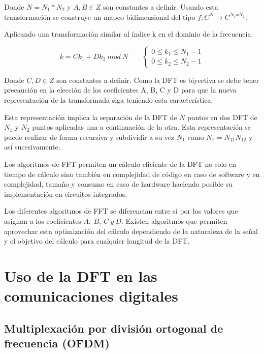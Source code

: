 Donde $N=N_1*N_2$ y $A,B \in Z$ son constantes a definir. Usando esta
transformación se construye un mapeo bidimensional del tipo $f:C^N\rightarrow
C^{N_1xN_2}$.

Aplicando una transformación similar al índice k en el dominio de la frecuencia:

\begin{equation}
k = Ck_1 + Dk_2 \ mod\ N \qquad 
	\begin{cases}
	0\leq k_1 \leq N_1 -1 \\
	0\leq k_2 \leq N_2 -1
	\end{cases}
\label{eq:freqInedx}
\end{equation}

Donde $C,D \in Z$ son constantes a definir. Como la DFT es biyectiva se debe
tener precaución en la elección de los coeficientes A, B, C y D para que la
nueva representación de la transformada siga teniendo esta característica.

Esta representación implica la separación de la DFT de $N$ puntos en dos DFT de
$N_1$ y $N_2$ puntos aplicadas una a continuación de la otra. Esta
representación se puede realizar de forma recursiva y subdividir a su vez $N_1$
como $N_1 = N_{11}N_{12}$ y así sucesivamente.

Los algoritmos de FFT permiten un cálculo eficiente de la DFT no solo en tiempo
de cálculo sino también en complejidad de código en caso de software y en
complejidad, tamaño y consumo en caso de hardware haciendo posible su implementación
en circuitos integrados.

Los diferentes algoritmos de FFT se diferencian entre sí por los valores
que asignan a los coeficientes $A,\ B,\ C\ y\ D$. Existen algoritmos que
permiten aprovechar esta optimización del cálculo dependiendo de la naturaleza
de la señal y el objetivo del cálculo para cualquier longitud de la DFT.

\section{Uso de la DFT en las comunicaciones digitales}
\subsection{Multiplexación por división ortogonal de frecuencia (OFDM)}

